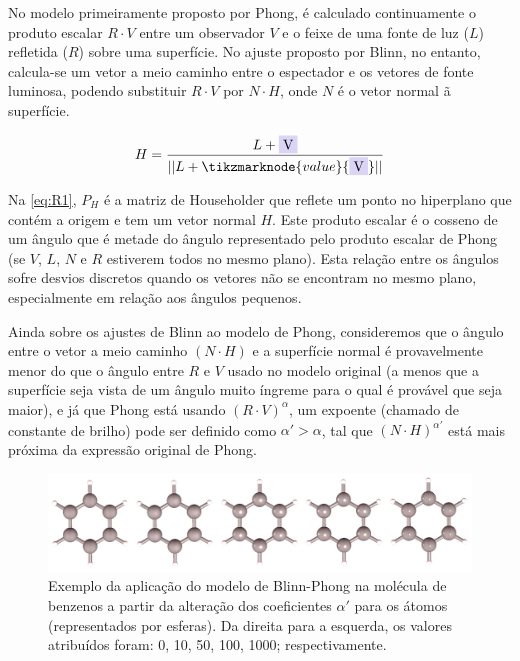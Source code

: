 No modelo primeiramente proposto por Phong, é calculado continuamente o produto escalar $R \cdot V$ entre um observador $V$ e o feixe de uma fonte de luz ($L$) refletida ($R$) sobre uma superfície. No ajuste proposto por Blinn, no entanto, calcula-se um vetor a meio caminho entre o espectador e os vetores de fonte luminosa, podendo substituir $R \cdot V$ por $N \cdot H$, onde $N$ é o vetor normal ã superfície.

\begin{figure}[htb]
\begin{equation}
    \label{eq:R1}
    H = \frac{L + \highlight{blue}{V} }{||L + \tikzmarknode{value}{\highlight{blue}{V}}||}
\end{equation}
\vspace{2\baselineskip}
\end{figure}

Na \autoref{eq:R1}, $P_H$ é a matriz de Householder que reflete um ponto no hiperplano que contém a origem e tem um vetor normal $H$. Este produto escalar é o cosseno de um ângulo que é metade do ângulo representado pelo produto escalar de Phong (se $V$, $L$, $N$ e $R$ estiverem todos no mesmo plano). Esta relação entre os ângulos sofre desvios discretos quando os vetores não se encontram no mesmo plano, especialmente em relação aos ângulos pequenos.

Ainda sobre os ajustes de Blinn ao modelo de Phong, consideremos que o ângulo entre o vetor a meio caminho $(N \cdot H)$ e a superfície normal é provavelmente menor do que o ângulo entre $R$ e $V$ usado no modelo original (a menos que a superfície seja vista de um ângulo muito íngreme para o qual é provável que seja maior), e já que Phong está usando $(R \cdot V)^\alpha$, um expoente (chamado de constante de brilho) pode ser definido como $\alpha' > \alpha$, tal que $(N \cdot H)^{\alpha'}$ está mais próxima da expressão original de Phong.

\begin{figure}[htb]
\caption{\label{fig:representations} Exemplo da aplicação do modelo de Blinn-Phong na molécula de benzenos a partir da alteração dos coeficientes $\alpha'$ para os átomos (representados por esferas). Da direita para a esquerda, os valores atribuídos foram: 0, 10, 50, 100, 1000; respectivamente.}
	\begin{center}
		\includegraphics[width=1.0\textwidth]{images/shininess(1).png}
	\end{center}
\end{figure}

